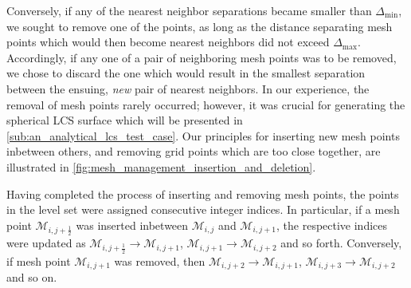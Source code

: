 Conversely, if any of the nearest neighbor separations became smaller than
$\Delta_{\min}$, we sought to remove one of the points, as long as the
distance separating mesh points which would then become nearest neighbors
did not exceed $\Delta_{\max}$. Accordingly, if any one of a pair of
neighboring mesh points was to be removed, we chose to discard the one which
would result in the smallest separation between the ensuing, \emph{new} pair of
nearest neighbors. In our experience, the removal of mesh points rarely
occurred; however, it was crucial for generating the spherical LCS surface
which will be presented in \cref{sub:an_analytical_lcs_test_case}.
Our principles for inserting new mesh points inbetween
others, and removing grid points which are too close together, are illustrated
in \cref{fig:mesh_management_insertion_and_deletion}.



Having completed the process of inserting and removing mesh points, the
points in the level set were assigned consecutive integer indices. In
particular, if a mesh point $\mathcal{M}_{i,j+\frac{1}{2}}$ was inserted
inbetween $\mathcal{M}_{i,j}$ and $\mathcal{M}_{i,j+1}$, the respective indices
were updated as $\mathcal{M}_{i,j+\frac{1}{2}}\to\mathcal{M}_{i,j+1}$,
$\mathcal{M}_{i,j+1}\to\mathcal{M}_{i,j+2}$ and so forth. Conversely, if mesh
point $\mathcal{M}_{i,j+1}$ was removed, then
$\mathcal{M}_{i,j+2}\to\mathcal{M}_{i,j+1}$,
$\mathcal{M}_{i,j+3}\to\mathcal{M}_{i,j+2}$ and so on.
